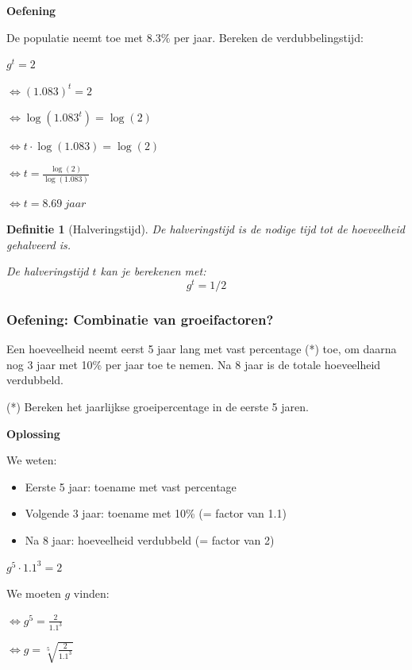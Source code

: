 \documentclass{article}
\newtheorem{theorem}{Definitie}[section]
\begin{document}
\textbf{Oefening}

De populatie neemt toe met $8.3\%$ per jaar. Bereken de verdubbelingstijd:

\begin{center}
$g^t = 2$

$\Leftrightarrow (1.083)^t = 2$

$\Leftrightarrow \log(1.083^t) = \log(2)$

$\Leftrightarrow t \cdot \log(1.083) = \log(2)$

$\Leftrightarrow t = \frac{\log(2)}{\log(1.083)}$

$\Leftrightarrow t = 8.69\ jaar$

\end{center}


\begin{theorem}[Halveringstijd]
De halveringstijd is de nodige tijd tot de hoeveelheid gehalveerd is.

De halveringstijd $t$ kan je berekenen met:
\begin{equation}
g^t = 1/2
\end{equation}
\end{theorem}

\subsubsection{Oefening: Combinatie van groeifactoren?}

Een hoeveelheid neemt eerst 5 jaar lang met vast percentage (*) toe, 
om daarna nog 3 jaar met 10\% per jaar toe te nemen. Na 8 jaar is
de totale hoeveelheid verdubbeld.

(*) Bereken het jaarlijkse groeipercentage in de eerste 5 jaren.

\textbf{Oplossing}

We weten:

\begin{itemize}
    \item Eerste 5 jaar: toename met vast percentage
    \item Volgende 3 jaar: toename met 10\% (= factor van 1.1)
    \item Na 8 jaar: hoeveelheid verdubbeld (= factor van 2)
\end{itemize}

\begin{center}
$g^5 \cdot 1.1^3 = 2$

We moeten $g$ vinden:

$\Leftrightarrow g^5 = \frac{2}{1.1^3}$

$\Leftrightarrow g = \sqrt[5]{\frac{2}{1.1^3}}$
\end{center}
\end{document}
